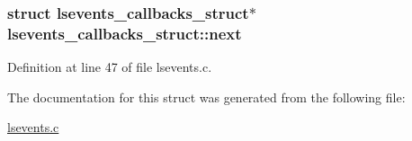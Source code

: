 \hypertarget{structlsevents__callbacks__struct_a6d673746e36b16df34d53e143c1ba881}{
\subsubsection[{next}]{\setlength{\rightskip}{0pt plus 5cm}struct {\bf lsevents\-\_\-callbacks\-\_\-struct}$\ast$ lsevents\-\_\-callbacks\-\_\-struct\-::next}}\label{structlsevents__callbacks__struct_a6d673746e36b16df34d53e143c1ba881}


Definition at line 47 of file lsevents.\-c.



The documentation for this struct was generated from the following file\-:\begin{DoxyCompactItemize}
\item 
\hyperlink{lsevents_8c}{lsevents.\-c}\end{DoxyCompactItemize}
